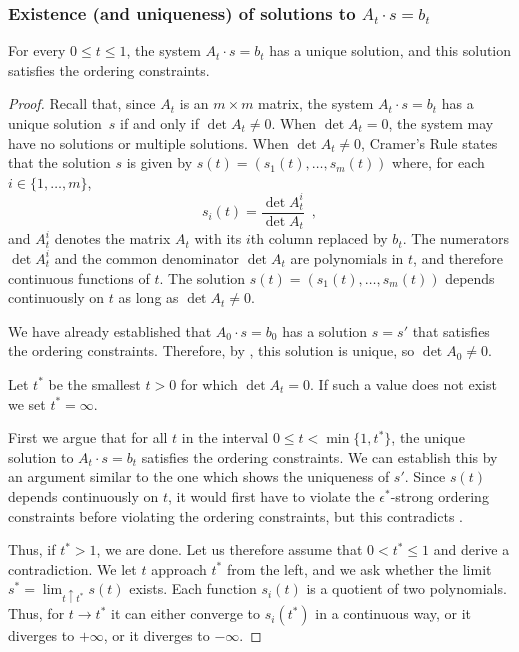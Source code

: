 \documentclass{patmorin}
\begin{document}
\subsubsection{Existence (and uniqueness) of solutions to $A_t\cdot s=b_t$}


\begin{lem}
   For every $0\le t\le 1$, the system $A_t\cdot s=b_t$ has a unique solution,
   and this solution satisfies the ordering constraints. %
\end{lem}

\begin{proof}
   Recall that, since $A_t$ is an $m\times m$ matrix, the system $A_t\cdot
   s=b_t$ has a unique solution~$s$ if and only if $\det A_t \neq 0$.
When $\det A_t =0$, the system may have no solutions or
   multiple solutions.  
When $\det A_t\neq 0$, 
   Cramer's Rule states that
the solution
   $s$ is given by $s(t)=(s_1(t),\ldots,s_m(t))$ where, for each
   $i\in\{1,\ldots,m\}$,
   \[ 
       s_i(t) = \frac{\det A_t^i}{\det A_t } \enspace ,
   \]
   and $A_t^i$ denotes the matrix $A_t$ with its $i$th column replaced
   by $b_t$. 
The numerators $\det A_t^i$ and the common
 denominator $\det A_t $ are polynomials in $t$, and therefore
 continuous
functions of $t$.
The solution $s(t)=(s_1(t),\ldots,s_m(t))$ depends continuously on $t$
as long as  $\det A_t\ne0 $.

   We have already established that $A_0\cdot s=b_0$ has a solution $s=s'$
   that satisfies the ordering constraints. Therefore, by , this solution
   is unique, so $\det A_0\neq 0$.

Let $t^*$ be the smallest $t>0$
for which 
 $\det A_{t}= 0$. If such a value does not exist we set $t^*=\infty$.

First we argue that for all $t$ in the interval
$0\le t < \min\{1,t^*\}$,
the unique
solution to $A_t\cdot s=b_t$
 satisfies the ordering constraints.
We can establish this by an argument
   similar to the one which shows the uniqueness of $s'$.
Since
 $s(t)$ depends continuously on $t$,
it would first have to violate the  $\epsilon^*$-strong ordering constraints
before violating the ordering constraints, but this contradicts
   .

Thus, if $t^*>1$, we are done.
Let us therefore assume that $0<t^*\le 1$ and derive a contradiction.
We let $t$ approach $t^*$ from the left, and we ask
whether the limit $s^*=\lim_{t\uparrow t^*}
   s(t)$ exists.
Each function $s_i(t)$ is a quotient of two polynomials.
Thus, for $t\to t^*$ it can either converge to $s_i(t^*)$ in a
continuous way, 
or it diverges to $+\infty$,
or it diverges to $-\infty$.


\end{proof}
\end{document}
